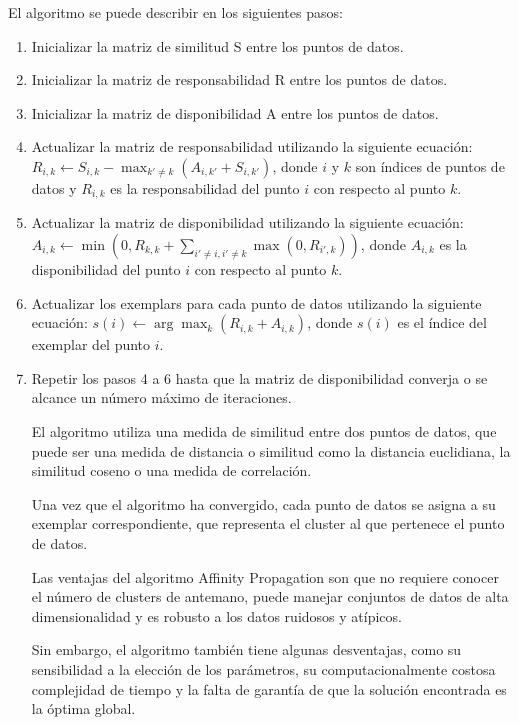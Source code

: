 El algoritmo se puede describir en los siguientes pasos:
\begin{enumerate}
	\item Inicializar la matriz de similitud S entre los puntos de datos.
	\item Inicializar la matriz de responsabilidad R entre los puntos de datos.
	\item Inicializar la matriz de disponibilidad A entre los puntos de datos.
	\item Actualizar la matriz de responsabilidad utilizando la siguiente ecuación: $R_{i,k} \leftarrow S_{i,k} - \max_{k' \neq k}(A_{i,k'} + S_{i,k'})$, donde $i$ y $k$ son índices de puntos de datos y $R_{i,k}$ es la responsabilidad del punto $i$ con respecto al punto $k$.
	\item Actualizar la matriz de disponibilidad utilizando la siguiente ecuación: $A_{i,k} \leftarrow \min(0, R_{k,k} + \sum_{i' \neq i, i' \neq k}\max(0, R_{i',k}))$, donde $A_{i,k}$ es la disponibilidad del punto $i$ con respecto al punto $k$.
	\item Actualizar los exemplars para cada punto de datos utilizando la siguiente ecuación: $s(i) \leftarrow \arg\max_k(R_{i,k} + A_{i,k})$, donde $s(i)$ es el índice del exemplar del punto $i$.
	\item Repetir los pasos 4 a 6 hasta que la matriz de disponibilidad converja o se alcance un número máximo de iteraciones.
	
El algoritmo utiliza una medida de similitud entre dos puntos de datos, que puede ser una medida de distancia o similitud como la distancia euclidiana, la similitud coseno o una medida de correlación.

Una vez que el algoritmo ha convergido, cada punto de datos se asigna a su exemplar correspondiente, que representa el cluster al que pertenece el punto de datos.

Las ventajas del algoritmo Affinity Propagation son que no requiere conocer el número de clusters de antemano, puede manejar conjuntos de datos de alta dimensionalidad y es robusto a los datos ruidosos y atípicos.

Sin embargo, el algoritmo también tiene algunas desventajas, como su sensibilidad a la elección de los parámetros, su computacionalmente costosa complejidad de tiempo y la falta de garantía de que la solución encontrada es la óptima global.
\end{enumerate}

